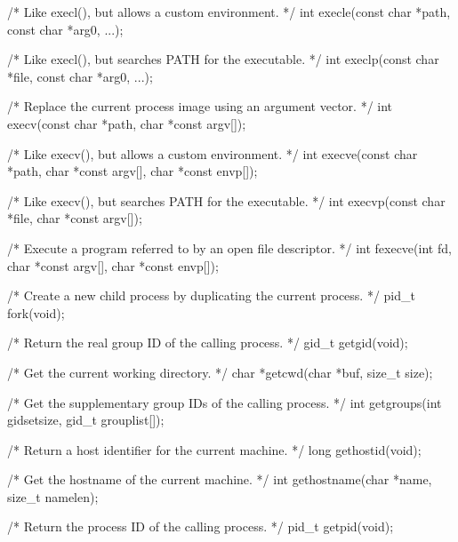 \documentclass{report}
\begin{document}
\begin{itemize}
\begin{cppcode}
                    /* Like execl(), but allows a custom environment. */
                    int execle(const char *path, const char *arg0, ...);

                    /* Like execl(), but searches PATH for the executable. */
                    int execlp(const char *file, const char *arg0, ...);

                    /* Replace the current process image using an argument vector. */
                    int execv(const char *path, char *const argv[]);

                    /* Like execv(), but allows a custom environment. */
                    int execve(const char *path, char *const argv[], char *const envp[]);

                    /* Like execv(), but searches PATH for the executable. */
                    int execvp(const char *file, char *const argv[]);
                \end{cppcode}
                \bigbreak \noindent 
                \begin{cppcode}
                    /* Execute a program referred to by an open file descriptor. */
                    int fexecve(int fd, char *const argv[], char *const envp[]);

                    /* Create a new child process by duplicating the current process. */
                    pid_t fork(void);

                    /* Return the real group ID of the calling process. */
                    gid_t getgid(void);

                    /* Get the current working directory. */
                    char *getcwd(char *buf, size_t size);

                    /* Get the supplementary group IDs of the calling process. */
                    int getgroups(int gidsetsize, gid_t grouplist[]);

                    /* Return a host identifier for the current machine. */
                    long gethostid(void);

                    /* Get the hostname of the current machine. */
                    int gethostname(char *name, size_t namelen);
                \end{cppcode}
                \bigbreak \noindent 
                \begin{cppcode}
                    /* Return the process ID of the calling process. */
                    pid_t getpid(void);


\end{cppcode}
\end{itemize}
\end{document}
